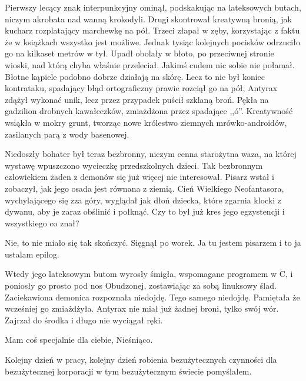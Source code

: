 Pierwszy lecący znak interpunkcyjny ominął, podskakując na lateksowych butach, niczym akrobata nad wanną krokodyli. 
Drugi skontrował kreatywną bronią, jak kucharz rozplatający marchewkę na pół.
Trzeci złapał w zęby, korzystając z faktu że w książkach wszystko jest możliwe.
Jednak tysiąc kolejnych pocisków odrzuciło go na kilkaset metrów w tył.
Upadł obolały w błoto, po przeciwnej stronie wioski, nad którą chyba właśnie przeleciał. Jakimś cudem nic sobie nie połamał. Błotne kąpiele podobno dobrze działają na skórę.
Lecz to nie był koniec kontrataku, spadający błąd ortograficzny prawie rozciął go na pół, Antyrax zdążył wykonać unik, lecz przez przypadek puścił szklaną broń. 
Pękła na gadzilion drobnych kawałeczków, zmiażdżona przez spadające ,,ó''.
Kreatywność wsiąkła w mokry grunt, tworząc nowe królestwo ziemnych mrówko-androidów, zasilanych parą z wody basenowej.

Niedoszły bohater był teraz bezbronny, niczym cenna starożytna waza, na której wystawę wpuszczono wycieczkę przedszkolnych dzieci. 
Tak bezbronnym człowiekiem żaden z demonów się już więcej nie interesował. Pisarz wstał i zobaczył, jak jego osada jest równana z ziemią.
Cień Wielkiego Neofantasora, wychylającego się zza góry, wyglądał jak dłoń dziecka, które zgarnia klocki z dywanu, aby je zaraz obślinić i połknąć.
Czy to był już kres jego egzystencji i wszystkiego co znał?

\begin{dialogue}
\ds{} Nie, to nie miało się tak skończyć. \dm{} Sięgnął po worek. \dm{} Ja tu jestem pisarzem i to ja ustalam epilog. 
\end{dialogue}

Wtedy jego lateksowym butom wyrosły śmigła, wspomagane programem w C, i poniosły go prosto pod nos Obudzonej, zostawiając za sobą linuksowy ślad.
Zaciekawiona demonica rozpoznała niedojdę. Tego samego niedojdę. Pamiętała że wcześniej go zmiażdżyła.
Antyrax nie miał już żadnej broni, tylko swój wór. Zajrzał do środka i długo nie wyciągał ręki.
\begin{dialogue}
\ds{} Mam coś specjalnie dla ciebie, Nieśniąco.
\end{dialogue}

\divider{}

\begin{dialogue}
\ds{} Kolejny dzień w pracy, kolejny dzień robienia bezużytecznych czynności dla bezużytecznej korporacji w tym bezużytecznym świecie \dm{} pomyślałem.
\end{dialogue}

